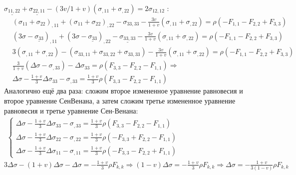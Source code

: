 $\underline{\sigma_{11,22}}+\underline{\sigma_{22,11}}-(3 v / 1+v)\left(\sigma_{, 11}+\sigma_{, 22}\right)=2 \sigma_{12,12}$ :
$$
\begin{aligned}
& \left(\sigma_{11}+\sigma_{22}\right)_{, 11}+\left(\sigma_{11}+\sigma_{22}\right)_{, 22}-\sigma_{33,33}-\frac{3 v}{1+v}\left(\sigma_{, 11}+\sigma_{, 22}\right)=\rho\left(-F_{1,1}-F_{2,2}+F_{3,3}\right) \\
& \left(3 \sigma-\underline{\sigma_{33}}\right)_{, 11}+\left(3 \sigma-\underline{\sigma_{33}}\right)_{, 22}-\underline{\sigma_{33,33}}-\frac{3 v}{1+v}\left(\sigma_{, 11}+\sigma_{, 22}\right)=\rho\left(-F_{1,1}-F_{2,2}+F_{3,3}\right) \\
& 3\left(\sigma_{, 11}+\sigma_{, 22}\right)-\left(\sigma_{33,11}+\sigma_{33,22}+\sigma_{33,33}\right)-\frac{3 v}{1+v}\left(\sigma_{, 11}+\sigma_{, 22}\right)=\rho\left(-F_{1,1}-F_{2,2}+F_{3,3}\right) \\
& \frac{3}{1+v}\left(\Delta \sigma-\sigma_{, 33}\right)-\Delta \sigma_{33}=\rho\left(F_{3,3}-F_{2,2}-F_{1,1}\right) \Rightarrow \\
&\Delta \sigma-\frac{1+v}{3} \Delta \sigma_{33}-\sigma_{, 33}=\frac{1+v}{3} \rho\left(F_{3,3}-F_{2,2}-F_{1,1}\right)
\end{aligned}
$$
Аналогично ещё два раза: сложим второе измененное уравнение равновесия и второе уравнение СенВенана, а затем сложим третье измененное уравнение равновесия и третье уравнение Сен-Венана:
$\displaystyle
\begin{aligned}
\left\{\begin{array}{l}
\Delta \sigma-\frac{1+v}{3} \Delta \sigma_{33}-\sigma_{,33}=\frac{1+v}{3} \rho\left(F_{3,3}-F_{2,2}-F_{1,1}\right) \\
\Delta \sigma-\frac{1+v}{3} \Delta \sigma_{22}-\sigma_{, 22}=\frac{1+v}{3} \rho\left(-F_{3,3}+F_{2,2}-F_{1,1}\right) \\
\Delta \sigma-\frac{1+v}{3} \Delta \sigma_{11}-\sigma_{,11}=\frac{1+v}{3} \rho\left(-F_{3,3}-F_{2,2}+F_{1,1}\right)
\end{array}\right.
\end{aligned}
$
$\displaystyle
3\Delta \sigma-(1+v) \Delta \sigma-\Delta \sigma=-\frac{1+v}{3} \rho F_{k, k} \Rightarrow
(1-v) \Delta \sigma=-\frac{1+v}{3} \rho F_{k, k} \Rightarrow
\Delta \sigma=-\frac{1+v}{3(1-v)} \rho F_{k, k}
$

